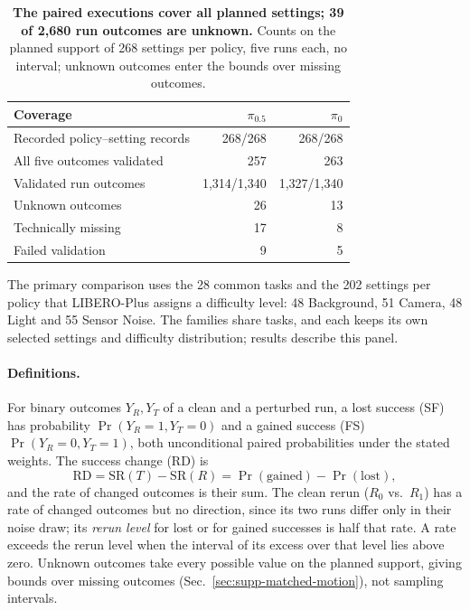 \begin{table}[t]
\caption{\textbf{The paired executions cover all planned settings; 39 of 2,680 run outcomes are unknown.} Counts on the planned support of 268 settings per policy, five runs each, no interval; unknown outcomes enter the bounds over missing outcomes.}

\centering\small
\setlength{\tabcolsep}{3.2pt}
\begin{tabular}{lrr}
\toprule
Coverage & $\pi_{0.5}$ & $\pi_0$\\
\midrule
Recorded policy--setting records & 268/268 & 268/268\\
All five outcomes validated & 257 & 263\\
Validated run outcomes & 1,314/1,340 & 1,327/1,340\\
Unknown outcomes & 26 & 13\\
\quad Technically missing & 17 & 8\\
\quad Failed validation & 9 & 5\\
\bottomrule
\end{tabular}

\label{tab:five-arm-coverage}
\end{table}

The primary comparison uses the 28 common tasks and the 202 settings per policy that LIBERO-Plus assigns a difficulty level: 48 Background, 51 Camera, 48 Light and 55 Sensor Noise. The families share tasks, and each keeps its own selected settings and difficulty distribution; results describe this panel.



\paragraph{Definitions.}
For binary outcomes $Y_R,Y_T$ of a clean and a perturbed run, a lost success (SF) has probability $\Pr(Y_R=1,Y_T=0)$ and a gained success (FS) $\Pr(Y_R=0,Y_T=1)$, both unconditional paired probabilities under the stated weights. The success change (RD) is
\begin{equation}
 \mathrm{RD}=\mathrm{SR}(T)-\mathrm{SR}(R)
            =\Pr(\mathrm{gained})-\Pr(\mathrm{lost}),
\end{equation}
and the rate of changed outcomes is their sum. The clean rerun ($R_0$ vs.\ $R_1$) has a rate of changed outcomes but no direction, since its two runs differ only in their noise draw; its \emph{rerun level} for lost or for gained successes is half that rate. A rate exceeds the rerun level when the interval of its excess over that level lies above zero. Unknown outcomes take every possible value on the planned support, giving bounds over missing outcomes (Sec.~\ref{sec:supp-matched-motion}), not sampling intervals.

